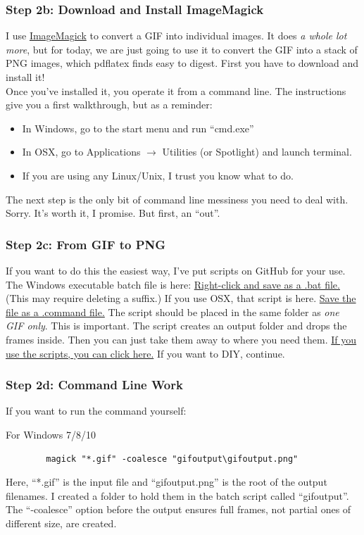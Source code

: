\documentclass{beamer}
\begin{document}
\begin{frame}
	\frametitle{Step 2b: Download and Install ImageMagick}
	I use \href{https://www.imagemagick.org/script/binary-releases.php}{ImageMagick} to convert a GIF into individual images. It does \emph{a whole lot more}, but for today, we are just going to use it to convert the GIF into a stack of PNG images, which pdflatex finds easy to digest. First you have to download and install it! \\
	Once you've installed it, you operate it from a command line. The instructions give you a first walkthrough, but as a reminder:
		\begin{itemize}
			\item In Windows, go to the start menu and run ``cmd.exe''
			\item In OSX, go to Applications $\rightarrow$ Utilities (or Spotlight) and launch terminal.
			\item If you are using any Linux/Unix, I trust you know what to do.
		\end{itemize}
	The next step is the only bit of command line messiness you need to deal with. Sorry. It's worth it, I promise. But first, an ``out''.
\end{frame}

\begin{frame}
	\frametitle{Step 2c: From GIF to PNG}
	If you want to do this the easiest way, I've put scripts on GitHub for your use. The Windows executable batch file is here: \href{https://raw.githubusercontent.com/abhworthington/gifsinbeamer/master/ImageMagickscripts/giftopng.bat}{Right-click and save as a .bat file.} (This may require deleting a suffix.) If you use OSX, that script is here. \href{https://github.com/abhworthington/gifsinbeamer/blob/master/ImageMagickscripts/giftopng.command}{Save the file as a .command file.}
	The script should be placed in the same folder as \emph{one GIF only}. This is important. The script creates an output folder and drops the frames inside. Then you can just take them away to where you need them. \hyperlink{STEP3a}{If you use the scripts, you can click here.} If you want to DIY, continue.
\end{frame}

\begin{frame}[fragile]
	\frametitle{Step 2d: Command Line Work}
	If you want to run the command yourself:
		\begin{block}{For Windows 7/8/10}
		\begin{verbatim}
		magick "*.gif" -coalesce "gifoutput\gifoutput.png"
		\end{verbatim}
		Here, ``*.gif'' is the input file and ``gifoutput.png'' is the root of the output filenames. I created a folder to hold them in the batch script called ``gifoutput''. The ``-coalesce'' option before the output ensures full frames, not partial ones of different size, are created.
		\end{block}
\end{frame}
\end{document}
